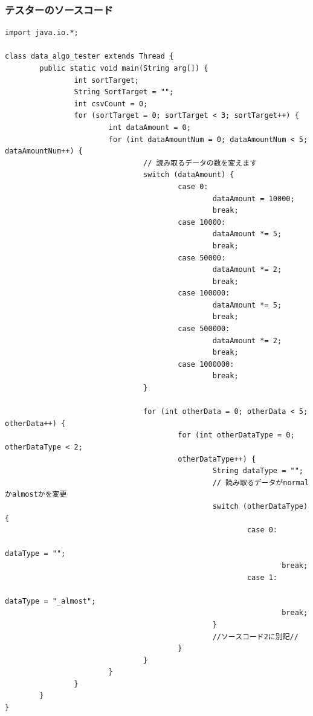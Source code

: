 \documentclass[a4j,dvipdfmx]{jsreport}
\begin{document}
\subsubsection{テスターのソースコード}
\lstset{caption=テスター,firstnumber=1}
\begin{lstlisting}[style=source]
import java.io.*;

class data_algo_tester extends Thread {
        public static void main(String arg[]) {
                int sortTarget;
                String SortTarget = "";
                int csvCount = 0;
                for (sortTarget = 0; sortTarget < 3; sortTarget++) {
                        int dataAmount = 0;
                        for (int dataAmountNum = 0; dataAmountNum < 5; dataAmountNum++) {
                                // 読み取るデータの数を変えます
                                switch (dataAmount) {
                                        case 0:
                                                dataAmount = 10000;
                                                break;
                                        case 10000:
                                                dataAmount *= 5;
                                                break;
                                        case 50000:
                                                dataAmount *= 2;
                                                break;
                                        case 100000:
                                                dataAmount *= 5;
                                                break;
                                        case 500000:
                                                dataAmount *= 2;
                                                break;
                                        case 1000000:
                                                break;
                                }

                                for (int otherData = 0; otherData < 5; otherData++) {
                                        for (int otherDataType = 0; otherDataType < 2; 
                                        otherDataType++) {
                                                String dataType = "";
                                                // 読み取るデータがnormalかalmostかを変更
                                                switch (otherDataType) {
                                                        case 0:
                                                                dataType = "";
                                                                break;
                                                        case 1:
                                                                dataType = "_almost";
                                                                break;
                                                }
                                                //ソースコード2に別記//
                                        }
                                }
                        }
                }
        }
}
\end{lstlisting}
\end{document}

